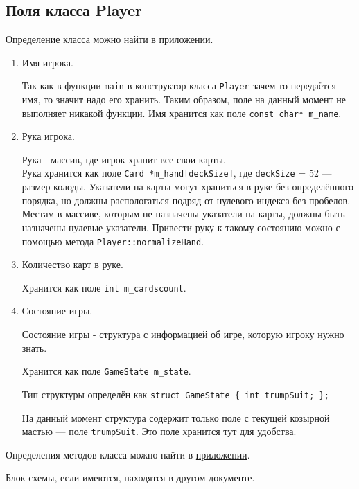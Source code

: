 \documentclass[a4paper,12pt]{article}
\begin{document}
		\subsection {Поля класса Player}
			{\large Определение класса можно найти в \hyperlink{CodePlayerH}{приложении}.}
			\begin{enumerate}
				\item Имя игрока.

					  Так как в функции \texttt{main} в конструктор класса \texttt{Player} зачем-то передаётся имя, то значит надо его хранить.
					  Таким образом, поле на данный момент не выполняет никакой функции.
					  Имя хранится как поле \texttt{const char* m\_name}.

				\item Рука игрока.

					  Рука - массив, где игрок хранит все свои карты.\\
					  Рука хранится как поле \texttt{Card *m\_hand[deckSize]}, где \texttt{deckSize} = 52 --- размер колоды.
					  Указатели на карты могут храниться в руке без определённого порядка, но должны распологаться подряд от нулевого индекса без пробелов.
					  Местам в массиве, которым не назначены указатели на карты, должны быть назначены нулевые указатели.
					  Привести руку к такому состоянию можно с помощью метода \texttt{Player::normalizeHand}.

			  	\item Количество карт в руке.

					  Хранится как поле \texttt{int m\_cardscount}.
				
			    \item Состояние игры.
					
					  Состояние игры - структура с информацией об игре, которую игроку нужно знать.

					  Хранится как поле \texttt{GameState m\_state}.

					  Тип структуры определён как \texttt{struct GameState \{ int trumpSuit; \};}

					  На данный момент структура содержит только поле с текущей козырной мастью --- поле \texttt{trumpSuit}.
					  Это поле хранится тут для удобства.

			\end{enumerate}

		{\large Определения методов класса можно найти в \hyperlink{CodePlayerCPP}{приложении}.}
		
		{\large Блок-схемы, если имеются, находятся в другом документе.}
\end{document}
